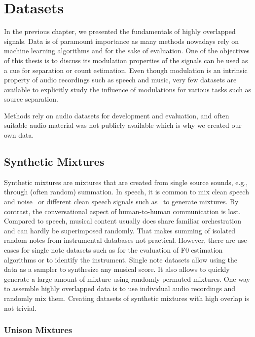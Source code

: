 \chapter{Datasets}
\label{cha:datasets}

In the previous chapter, we presented the fundamentals of highly overlapped signals.
Data is of paramount importance as many methods nowadays rely on machine learning algorithms and for the sake of evaluation.
One of the objectives of this thesis is to discuss its modulation properties of the signals can be used as a cue for separation or count estimation.
Even though modulation is an intrinsic property of audio recordings such as speech and music, very few datasets are available to explicitly study the influence of modulations for various tasks such as source separation.
\par
Methods rely on audio datasets for development and evaluation, and often suitable audio material was not publicly available which is why we created our own data.

\section{Synthetic Mixtures}

Synthetic mixtures are mixtures that are created from single source sounds, e.g., through (often random) summation. 
In speech, it is common to mix clean speech and noise~\cite{varga93} or different clean speech signals such as~\cite{garofolo93} to generate mixtures.
By contrast, the conversational aspect of human-to-human communication is lost.
Compared to speech, musical content usually does share familiar orchestration and can hardly be superimposed randomly. 
That makes summing of isolated random notes from instrumental databases not practical.
However, there are use-cases for single note datasets such as for the evaluation of F0 estimation algorithms or to identify the instrument.
Single note datasets allow using the data as a sampler to synthesize any musical score.
It also allows to quickly generate a large amount of mixture using randomly permuted mixtures.
One way to assemble highly overlapped data is to use individual audio recordings and randomly mix them.
Creating datasets of synthetic mixtures with high overlap is not trivial.

\subsection{Unison Mixtures}
\label{sec:scenario}

